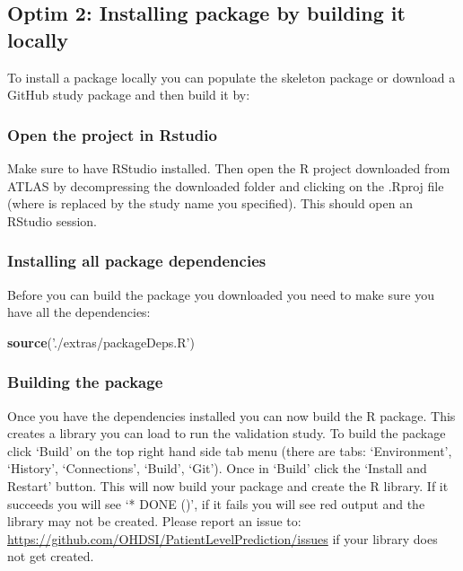 \documentclass[
]{article}
\newenvironment{Shaded}{\begin{snugshade}}{\end{snugshade}}
\newcommand{\KeywordTok}[1]{\textcolor[rgb]{0.13,0.29,0.53}{\textbf{#1}}}
\newcommand{\NormalTok}[1]{#1}
\newcommand{\StringTok}[1]{\textcolor[rgb]{0.31,0.60,0.02}{#1}}
\begin{document}
\hypertarget{optim-2-installing-package-by-building-it-locally}{%
\subsection{Optim 2: Installing package by building it
locally}\label{optim-2-installing-package-by-building-it-locally}}

To install a package locally you can populate the skeleton package or
download a GitHub study package and then build it by:

\hypertarget{open-the-project-in-rstudio}{%
\subsubsection{Open the project in
Rstudio}\label{open-the-project-in-rstudio}}

Make sure to have RStudio installed. Then open the R project downloaded
from ATLAS by decompressing the downloaded folder and clicking on the
.Rproj file (where is replaced by the study name you specified). This
should open an RStudio session.

\hypertarget{installing-all-package-dependencies}{%
\subsubsection{Installing all package
dependencies}\label{installing-all-package-dependencies}}

Before you can build the package you downloaded you need to make sure
you have all the dependencies:

\begin{Shaded}
\begin{Highlighting}[]
\KeywordTok{source}\NormalTok{(}\StringTok{'./extras/packageDeps.R'}\NormalTok{)}
\end{Highlighting}
\end{Shaded}

\hypertarget{building-the-package}{%
\subsubsection{Building the package}\label{building-the-package}}

Once you have the dependencies installed you can now build the R
package. This creates a library you can load to run the validation
study. To build the package click `Build' on the top right hand side tab
menu (there are tabs: `Environment', `History', `Connections', `Build',
`Git'). Once in `Build' click the `Install and Restart' button. This
will now build your package and create the R library. If it succeeds you
will see `* DONE ()', if it fails you will see red output and the
library may not be created. Please report an issue to:
\url{https://github.com/OHDSI/PatientLevelPrediction/issues} if your
library does not get created.
\end{document}
